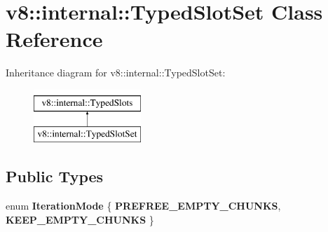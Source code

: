 \hypertarget{classv8_1_1internal_1_1TypedSlotSet}{}\section{v8\+:\+:internal\+:\+:Typed\+Slot\+Set Class Reference}
\label{classv8_1_1internal_1_1TypedSlotSet}
Inheritance diagram for v8\+:\+:internal\+:\+:Typed\+Slot\+Set\+:\begin{figure}[H]
\begin{center}
\leavevmode
\includegraphics[height=2.000000cm]{classv8_1_1internal_1_1TypedSlotSet}
\end{center}
\end{figure}
\subsection*{Public Types}
\begin{DoxyCompactItemize}
\item 
\mbox{\label{classv8_1_1internal_1_1TypedSlotSet_ad001304aa91a8a6885dce63d2eac48a0}} 
enum {\bfseries Iteration\+Mode} \{ {\bfseries P\+R\+E\+F\+R\+E\+E\+\_\+\+E\+M\+P\+T\+Y\+\_\+\+C\+H\+U\+N\+KS}, 
{\bfseries K\+E\+E\+P\+\_\+\+E\+M\+P\+T\+Y\+\_\+\+C\+H\+U\+N\+KS}
 \}
\end{DoxyCompactItemize}
